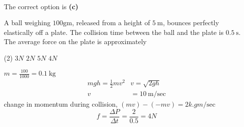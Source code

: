 \begin{enumerate}
\begin{answer}
\begin{align*}
	\end{align*}
	The correct option is \textbf{(c)}
\end{answer}
\begin{minipage}{\textwidth}
	\item A ball weighing $100 \mathrm{gm}$, released from a height of $5 \mathrm{~m}$, bounces perfectly elastically off a plate. The collision time between the ball and the plate is $0.5 \mathrm{~s}$. The average force on the plate is approximately
\end{minipage}
\begin{tasks}(2)
	\task[\textbf{A.}] $3 N$
	\task[\textbf{B.}]$2 N$
	\task[\textbf{C.}]$5 N$
	\task[\textbf{D.}]$4 N$
\end{tasks}
\begin{answer}
$m=\frac{100}{1000}=0.1 \mathrm{~kg}$\\
$$
\begin{array}{rl}
m g h=\frac{1}{2} m v^{2} & v=\sqrt{2 g h} \\
v & =10 \mathrm{~m} / \mathrm{sec}
\end{array}
$$
change in momentum during collision, $(m v)-(-m v)=2 k . g m / \mathrm{sec}$
$$
f=\frac{\Delta P}{\Delta t}=\frac{2}{0.5}=4 N
$$	
\end{answer}
\end{enumerate}